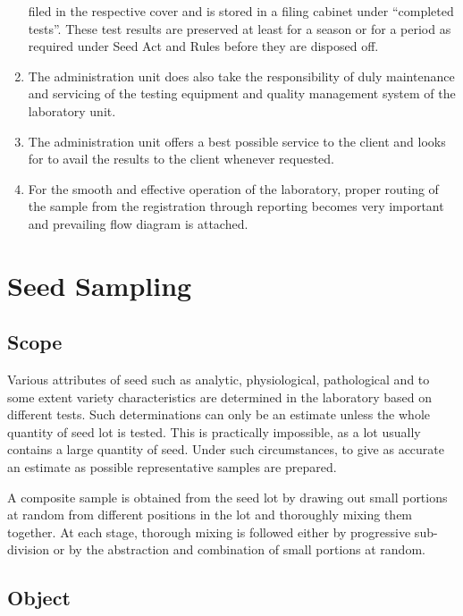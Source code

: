 \documentclass[]{book}
\begin{document}
\begin{enumerate}
  filed in the respective cover and is stored in a filing cabinet under
  ``completed tests''. These test results are preserved at least for a
  season or for a period as required under Seed Act and Rules before
  they are disposed off.
\item
  The administration unit does also take the responsibility of duly
  maintenance and servicing of the testing equipment and quality
  management system of the laboratory unit.
\item
  The administration unit offers a best possible service to the client
  and looks for to avail the results to the client whenever requested.
\item
  For the smooth and effective operation of the laboratory, proper
  routing of the sample from the registration through reporting becomes
  very important and prevailing flow diagram is attached.
\end{enumerate}

\hypertarget{htmlwidget-d3f5df0d83754977b150}{}

\chapter{Seed Sampling}\label{seed-sampling}

\section{Scope}\label{scope}

Various attributes of seed such as analytic, physiological, pathological
and to some extent variety characteristics are determined in the
laboratory based on different tests. Such determinations can only be an
estimate unless the whole quantity of seed lot is tested. This is
practically impossible, as a lot usually contains a large quantity of
seed. Under such circumstances, to give as accurate an estimate as
possible representative samples are prepared.

A composite sample is obtained from the seed lot by drawing out small
portions at random from different positions in the lot and thoroughly
mixing them together. At each stage, thorough mixing is followed either
by progressive sub-division or by the abstraction and combination of
small portions at random.

\section{Object}\label{object}
\end{document}
